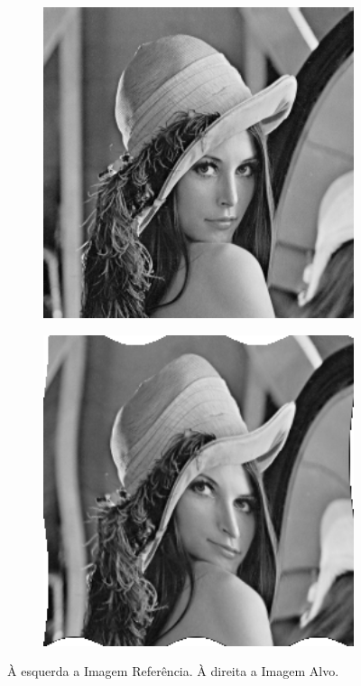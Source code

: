 \documentclass[t]{beamer}
\begin{document}
\begin{frame}
  \begin{figure}[H]
    \centering
    \begin{subfigure}[b]{0.49\textwidth}
      \includegraphics[width=1\textwidth]{figuras/static.png}
    \end{subfigure}
    \begin{subfigure}[b]{0.49\textwidth}
      \includegraphics[width=1\textwidth]{figuras/lenaMoving.png}
    \end{subfigure}
    \caption{À esquerda a Imagem Referência. À direita a Imagem Alvo.}
  \end{figure}
\end{frame}
\end{document}
